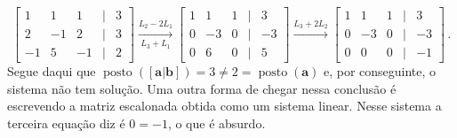 \documentclass[12pt,a4paper]{report}
\newcommand{\mb}{\mathbf}
\DeclareMathOperator{\posto}{posto}
\begin{document}
\begin{enumerate}
$$\begin{bmatrix}
    1&1&1&|&3\\
    2&-1&2&|&3\\
    -1&5&-1&|&2
  \end{bmatrix}\xrightarrow[L_3+L_1]{L_2-2L_1} \begin{bmatrix}
    1&1&1&|&3\\
    0&-3&0&|&-3\\
    0&6&0&|&5
  \end{bmatrix}\xrightarrow{L_3+2L_2} \begin{bmatrix}
    1&1&1&|&3\\
    0&-3&0&|&-3\\
    0&0&0&|&-1
  \end{bmatrix}\,.$$
  Segue daqui que $\posto([\mb a|\mb b])=3\ne 2=\posto(\mb a)$ e, por conseguinte, o sistema não tem solução. Uma outra forma de chegar nessa conclusão é escrevendo a matriz escalonada obtida como um sistema linear. Nesse sistema a terceira equação diz é $0=-1$, o que é absurdo.
\end{enumerate}
\end{document}
